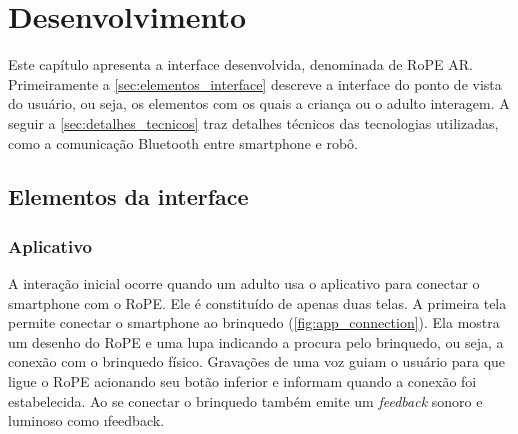 \chapter{Desenvolvimento}
\label{c_desenvolvimento}

Este capítulo apresenta a interface desenvolvida, denominada de RoPE AR. Primeiramente a \autoref{sec:elementos_interface} descreve a interface do ponto de vista do usuário, ou seja, os elementos com os quais a criança ou o adulto interagem. A seguir a \autoref{sec:detalhes_tecnicos} traz detalhes técnicos das tecnologias utilizadas, como a comunicação Bluetooth entre smartphone e robô.

\section{Elementos da interface}
\label{sec:elementos_interface}
\subsection{Aplicativo}
A interação inicial ocorre quando um adulto usa o aplicativo para conectar o smartphone com o RoPE. Ele é constituído de apenas duas telas. A primeira tela permite conectar o smartphone ao brinquedo (\autoref{fig:app_connection}). Ela mostra um desenho do RoPE e uma lupa indicando a procura pelo brinquedo, ou seja, a conexão com o brinquedo físico. Gravações de uma voz guiam o usuário para que ligue o RoPE acionando seu botão inferior e informam quando a conexão foi estabelecida. Ao se conectar o brinquedo também emite um \textit{feedback} sonoro e luminoso como \i{feedback}.

